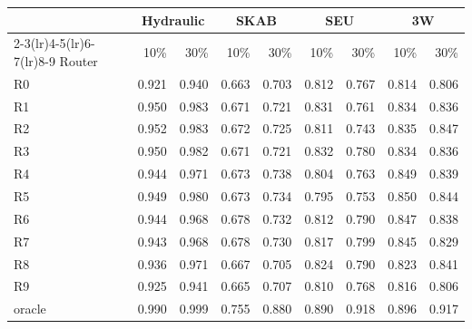 \begin{tabular}{@{}l rrrrrrrr@{}}
\toprule
& \multicolumn{2}{c}{Hydraulic} & \multicolumn{2}{c}{SKAB} & \multicolumn{2}{c}{SEU} & \multicolumn{2}{c}{3W} \\
\cmidrule(lr){2-3}\cmidrule(lr){4-5}\cmidrule(lr){6-7}\cmidrule(lr){8-9}
Router & 10\% & 30\% & 10\% & 30\% & 10\% & 30\% & 10\% & 30\% \\
\midrule
R0 & 0.921 & 0.940 & 0.663 & 0.703 & 0.812 & 0.767 & 0.814 & 0.806 \\
R1 & 0.950 & 0.983 & 0.671 & 0.721 & 0.831 & 0.761 & 0.834 & 0.836 \\
R2 & 0.952 & 0.983 & 0.672 & 0.725 & 0.811 & 0.743 & 0.835 & 0.847 \\
R3 & 0.950 & 0.982 & 0.671 & 0.721 & 0.832 & 0.780 & 0.834 & 0.836 \\
R4 & 0.944 & 0.971 & 0.673 & 0.738 & 0.804 & 0.763 & 0.849 & 0.839 \\
R5 & 0.949 & 0.980 & 0.673 & 0.734 & 0.795 & 0.753 & 0.850 & 0.844 \\
R6 & 0.944 & 0.968 & 0.678 & 0.732 & 0.812 & 0.790 & 0.847 & 0.838 \\
R7 & 0.943 & 0.968 & 0.678 & 0.730 & 0.817 & 0.799 & 0.845 & 0.829 \\
R8 & 0.936 & 0.971 & 0.667 & 0.705 & 0.824 & 0.790 & 0.823 & 0.841 \\
R9 & 0.925 & 0.941 & 0.665 & 0.707 & 0.810 & 0.768 & 0.816 & 0.806 \\
oracle & 0.990 & 0.999 & 0.755 & 0.880 & 0.890 & 0.918 & 0.896 & 0.917 \\
\bottomrule
\end{tabular}
